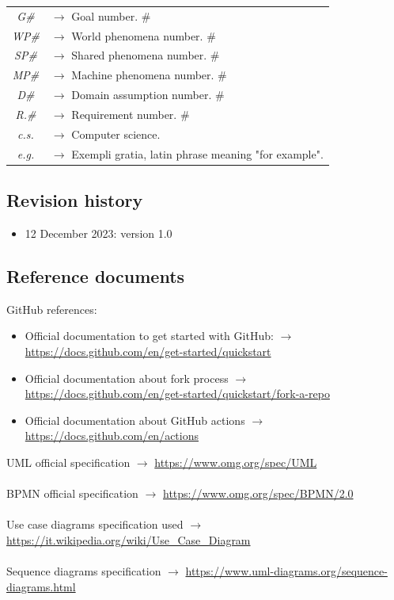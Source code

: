 \documentclass{article}
\begin{document}
{\begin{xltabular}{\textwidth}{ >{\raggedright\arraybackslash}c >{\raggedright\arraybackslash}X }
    \textit{G\#} & $\rightarrow$ Goal number. \#
    \\
    \textit{WP\#} & $\rightarrow$ World phenomena number. \#
    \\
    \textit{SP\#} & $\rightarrow$ Shared phenomena number. \#
    \\
    \textit{MP\#} & $\rightarrow$ Machine phenomena number. \#
    \\
    \textit{D\#} & $\rightarrow$ Domain assumption number. \#
    \\
    \textit{R.\#} & $\rightarrow$ Requirement number. \#
    \\
    \textit{c.s.} & $\rightarrow$ Computer science.
    \\
    \textit{e.g.} & $\rightarrow$ Exempli gratia, latin phrase meaning "for example".
\end{xltabular}

\subsection{Revision history}
\begin{itemize}
    \item 12 December 2023: version 1.0
\end{itemize}
\subsection{Reference documents}
GitHub references:
\begin{itemize}
    \item Official documentation to get started with GitHub: $\rightarrow$ \url{https://docs.github.com/en/get-started/quickstart}
    \item Official documentation about fork process $\rightarrow$ \url{https://docs.github.com/en/get-started/quickstart/fork-a-repo}
    \item Official documentation about GitHub actions $\rightarrow$ \url{https://docs.github.com/en/actions}
\end{itemize}
UML official specification $\rightarrow$ \url{https://www.omg.org/spec/UML}
\\ \\
BPMN official specification $\rightarrow$ \url{https://www.omg.org/spec/BPMN/2.0}
\\ \\
Use case diagrams specification used $\rightarrow$ \url{https://it.wikipedia.org/wiki/Use_Case_Diagram}
\\ \\
Sequence diagrams specification $\rightarrow$ \url{https://www.uml-diagrams.org/sequence-diagrams.html}
}
\end{document}
